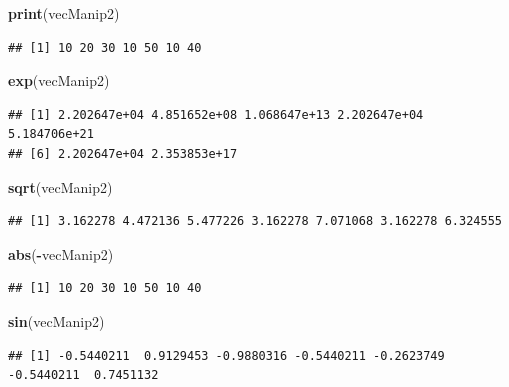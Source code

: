 \documentclass[
]{book}
\newenvironment{Shaded}{\begin{snugshade}}{\end{snugshade}}
\newcommand{\KeywordTok}[1]{\textcolor[rgb]{0.13,0.29,0.53}{\textbf{#1}}}
\newcommand{\NormalTok}[1]{#1}
\newcommand{\OperatorTok}[1]{\textcolor[rgb]{0.81,0.36,0.00}{\textbf{#1}}}
\begin{document}
\begin{Shaded}
\begin{Highlighting}[]
\KeywordTok{print}\NormalTok{(vecManip2)}
\end{Highlighting}
\end{Shaded}

\begin{verbatim}
## [1] 10 20 30 10 50 10 40
\end{verbatim}

\begin{Shaded}
\begin{Highlighting}[]
\KeywordTok{exp}\NormalTok{(vecManip2)}
\end{Highlighting}
\end{Shaded}

\begin{verbatim}
## [1] 2.202647e+04 4.851652e+08 1.068647e+13 2.202647e+04 5.184706e+21
## [6] 2.202647e+04 2.353853e+17
\end{verbatim}

\begin{Shaded}
\begin{Highlighting}[]
\KeywordTok{sqrt}\NormalTok{(vecManip2)}
\end{Highlighting}
\end{Shaded}

\begin{verbatim}
## [1] 3.162278 4.472136 5.477226 3.162278 7.071068 3.162278 6.324555
\end{verbatim}

\begin{Shaded}
\begin{Highlighting}[]
\KeywordTok{abs}\NormalTok{(}\OperatorTok{-}\NormalTok{vecManip2)}
\end{Highlighting}
\end{Shaded}

\begin{verbatim}
## [1] 10 20 30 10 50 10 40
\end{verbatim}

\begin{Shaded}
\begin{Highlighting}[]
\KeywordTok{sin}\NormalTok{(vecManip2)}
\end{Highlighting}
\end{Shaded}

\begin{verbatim}
## [1] -0.5440211  0.9129453 -0.9880316 -0.5440211 -0.2623749 -0.5440211  0.7451132
\end{verbatim}
\end{document}

